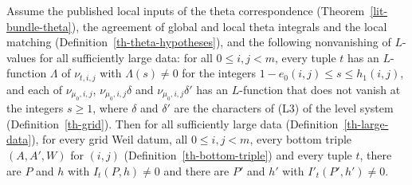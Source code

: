 \begin{theorem}\label{th-first-lift-nonzero}
Assume the published local inputs of the theta correspondence
(Theorem~\ref{lit-bundle-theta}), the agreement of global and local theta
integrals and the local matching (Definition~\ref{th-theta-hypotheses}), and the
following nonvanishing of $L$-values for all sufficiently large data: for all
$0\leq i,j<m$, every tuple $t$ has an $L$-function $\Lambda$ of
$\nu_{t,i,j}$ with $\Lambda(s)\neq0$ for the integers
$1-e_0(i,j)\leq s\leq h_1(i,j)$, and each of $\nu_{\mu_0,i,j}$,
$\nu_{\mu_0,i,j}\delta$ and $\nu_{\mu_0,i,j}\delta'$ has an $L$-function that
does not vanish at the integers $s\geq1$, where $\delta$ and $\delta'$ are the
characters of (L3) of the level system (Definition~\ref{th-grid}). Then for all
sufficiently large data
(Definition~\ref{th-large-data}), for every grid Weil datum, all $0\leq i,j<m$,
every bottom triple $(A,A',W)$ for $(i,j)$
(Definition~\ref{th-bottom-triple}) and every tuple $t$, there are $P$ and $h$
with $I_t(P,h)\neq0$ and there are $P'$ and $h'$ with $I'_t(P',h')\neq0$.
\end{theorem}
